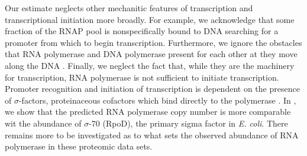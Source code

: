 Our estimate neglects other mechanitic features of transcription and
transcriptional initiation more broadly. For example, we acknowledge that some
fraction of the RNAP pool is nonspecifically bound to DNA searching for a
promoter from which to begin transcription. Furthermore, we ignore 
the obstacles that RNA polymerase and DNA polymerase present for each other at
they move along the DNA \citep{finkelstein2013}. Finally, we neglect the fact
that, while they are the machinery for transcription, RNA polymerase is not
sufficient to initiate transcription. Promoter recognition and initiation of
transcription is dependent on the presence of $\sigma$-factors, proteinaceous
cofactors which bind directly to the polymerase \citep{browning2016}. In
, we show that the predicted RNA polymerase
copy number is more comparable wit the abundance of $\sigma$-70 (RpoD), the
primary sigma factor in \textit{E. coli}. There remains more to be investigated as  to what sets the observed abundance of
RNA polymerase in these proteomic data sets.






